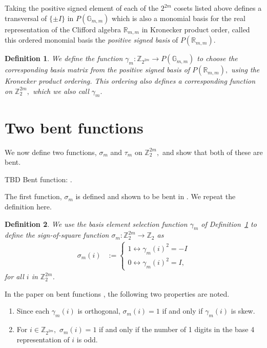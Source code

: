 \documentclass[12pt,a4paper]{article}
\newcommand{\mb}[1]{\mathbb{#1}}
\newcommand{\G}{\mb{G}}
\newcommand{\R}{\mb{R}}
\newcommand{\Z}{\mb{Z}}
\newcommand{\Rep}{P}
\newcommand{\To}{\rightarrow}
\newtheorem*{definition}{Definition}
\begin{document}
Taking the positive signed element of each of the $2^{2m}$ cosets listed above
defines a transversal of $\{\pm I\}$ in $\Rep(\G_{m,m})$
which is also a monomial basis for the real representation of the Clifford algebra $\R_{m,m}$ in 
Kronecker product order,
called this ordered monomial basis the \emph{positive signed basis} of $\Rep(\R_{m,m}).$ 

\begin{definition}\label{definition-gamma}
We define the function $\gamma_m : \Z_{2^{2 m}} \To \Rep(\G_{m,m})$ 
to choose the corresponding basis matrix from the positive signed basis of $\Rep(\R_{m,m}),$
using the Kronecker product ordering.
This ordering also defines a corresponding function on $\Z_2^{2 m},$
which we also call $\gamma_m.$
\end{definition}

\section{Two bent functions}
\label{sec-second-bent}

We now define two functions, $\sigma_m$ and $\tau_m$ on $\Z_2^{2 m},$
and show that both of these are bent.

TBD Bent function: \cite[p. 74]{Dil74}.

The first function, $\sigma_m$ is defined and shown to be bent in \cite{Leo14Constructions}.
We repeat the definition here.

\begin{definition}\label{definition-sign-of-square-function}
We use the basis element selection function $\gamma_m$ of Definition~\ref{definition-gamma} to 
define the \emph{sign-of-square} function $\sigma_m : \Z_2^{2 m} \To \Z_2$ as
\begin{align*}
\sigma_m(i) &:=
\begin{cases}
1 \leftrightarrow \gamma_m(i)^2 = -I
\\
0 \leftrightarrow \gamma_m(i)^2 = I,
\end{cases}
\end{align*}
for all $i$ in $\Z_2^{2 m}$.
\end{definition}
In the paper on bent functions \cite{Leo15Bent}, the following two properties are noted.
\begin{enumerate}
 \item 
Since each $\gamma_m(i)$ is orthogonal,
$\sigma_m(i) = 1$ if and only if $\gamma_m(i)$ is skew.
 \item 
For $i \in \Z_{2^{2m}},$ $\sigma_m(i) = 1$ if and only if the number of
1 digits in  the base 4 representation of $i$ is odd.
\end{enumerate}
\end{document}
